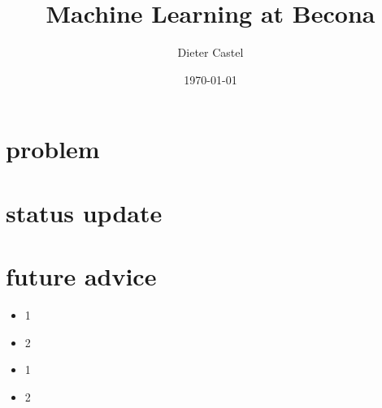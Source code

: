 \documentclass{beamer}
\title{Machine Learning at Becona}
\author{Dieter Castel}
\date{\today}
\begin{document}
\begin{frame}
  \titlepage
\end{frame}

\section{problem}
\section{status update}
\section{future advice}

\begin{frame}
  \begin{itemize}
	    \item 1
            \item 2
  \end{itemize}

\end{frame}


\begin{frame}
  \begin{itemize}
	    \item 1
            \item 2
  \end{itemize}

\end{frame}
\end{document}
